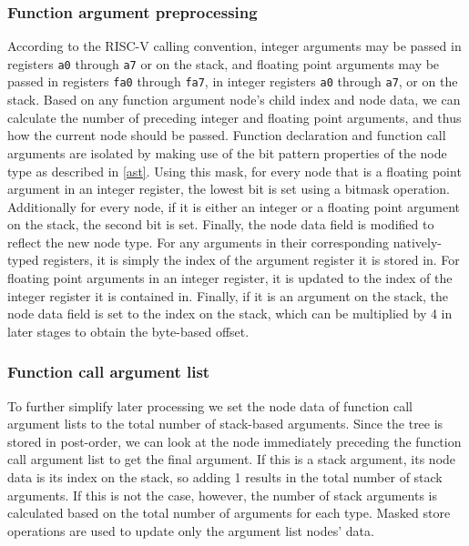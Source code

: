 \documentclass[11pt,dvipsnames]{article}
\newcommand{\mono}[1]{\texttt{#1}}
\begin{document}
\subsubsection*{Function argument preprocessing}
According to the RISC-V calling convention, integer arguments may be passed in registers \mono{a0} through \mono{a7} or on the stack, and floating point arguments may be passed in registers \mono{fa0} through \mono{fa7}, in integer registers \mono{a0} through \mono{a7}, or on the stack. Based on any function argument node's child index and node data, we can calculate the number of preceding integer and floating point arguments, and thus how the current node should be passed. Function declaration and function call arguments are isolated by making use of the bit pattern properties of the node type as described in \autoref{ast}. Using this mask, for every node that is a floating point argument in an integer register, the lowest bit is set using a bitmask operation. Additionally for every node, if it is either an integer or a floating point argument on the stack, the second bit is set. Finally, the node data field is modified to reflect the new node type. For any arguments in their corresponding natively-typed registers, it is simply the index of the argument register it is stored in. For floating point arguments in an integer register, it is updated to the index of the integer register it is contained in. Finally, if it is an argument on the stack, the node data field is set to the index on the stack, which can be multiplied by 4 in later stages to obtain the byte-based offset. 

\subsubsection*{Function call argument list}
To further simplify later processing we set the node data of function call argument lists to the total number of stack-based arguments. Since the tree is stored in post-order, we can look at the node immediately preceding the function call argument list to get the final argument. If this is a stack argument, its node data is its index on the stack, so adding 1 results in the total number of stack arguments. If this is not the case, however, the number of stack arguments is calculated based on the total number of arguments for each type. Masked store operations are used to update only the argument list nodes' data.
\end{document}
